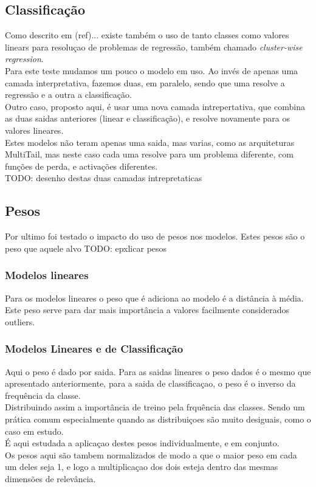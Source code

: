 \subsection{Classificação}

Como descrito em (ref)... existe também o uso de tanto classes como valores linears para resoluçao de problemas de regressão, também chamado \textit{cluster-wise regression}.\\
Para este teste mudamos um pouco o modelo em uso. Ao invés de apenas uma camada interpretativa, fazemos duas, em paralelo, sendo que uma resolve a regressão e a outra a classificação.\\
Outro caso, proposto aqui, é usar uma nova camada intrepertativa, que combina as duas saidas anteriores (linear e classificação), e resolve novamente para os valores lineares.\\
Estes modelos não teram apenas uma saida, mas varias, como as arquiteturas MultiTail, mas neste caso cada uma resolve para um problema diferente, com funções de perda, e activações diferentes.\\

TODO: desenho destas duas camadas intrepretaticas

\subsection{Pesos}

Por ultimo foi testado o impacto do uso de pesos nos modelos. Estes pesos são o peso que aquele alvo TODO: epxlicar pesos

\subsubsection{Modelos lineares}

Para os modelos lineares o peso que é adiciona ao modelo é a distância à média.\\
Este peso serve para dar mais importância a valores facilmente considerados outliers.\\



\subsubsection{Modelos Lineares e de Classificação}
Aqui o peso é dado por saida. Para as saidas lineares o peso dados é o mesmo que apresentado anteriormente, para a saida de classificaçao, o peso é o inverso da frequência da classe.\\
Distribuindo assim a importância de treino pela frquência das classes. Sendo um prática comum especialmente quando as distribuiçoes são muito desiguais, como o caso em estudo.\\
É aqui estudada a aplicaçao destes pesos individualmente, e em conjunto. \\
Os pesos aqui são tambem normalizados de modo a que o maior peso em cada um deles seja 1, e logo a multiplicaçao dos dois esteja dentro das mesmas dimensões de relevância.\\


